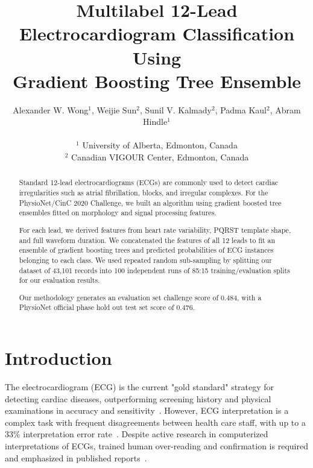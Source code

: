 \documentclass[twocolumn]{cinc}
\begin{document}


\title{Multilabel 12-Lead Electrocardiogram Classification Using \\
Gradient Boosting Tree Ensemble}

\author {Alexander W. Wong$^{1}$, Weijie Sun$^{2}$, Sunil V. Kalmady$^{2}$, Padma Kaul$^{2}$, Abram Hindle$^{1}$\\
\ \\
 $^1$ University of Alberta, Edmonton, Canada \\
$^2$ Canadian VIGOUR Center, Edmonton, Canada }

\maketitle

\begin{abstract}

Standard 12-lead electrocardiograms (ECGs) are commonly used to detect cardiac irregularities such as atrial fibrillation, blocks, and irregular complexes.
For the PhysioNet/CinC 2020 Challenge, we built an algorithm using gradient boosted tree ensembles fitted on morphology and signal processing features.

For each lead, we derived features from heart rate variability, PQRST template shape, and full waveform duration.
We concatenated the features of all 12 leads to fit an ensemble of gradient boosting trees and predicted probabilities of ECG instances belonging to each class.
We used repeated random sub-sampling by splitting our dataset of 43,101 records into 100 independent runs of 85:15 training/evaluation splits for our evaluation results.

Our methodology generates an evaluation set challenge score of 0.484, with a PhysioNet official phase hold out test set score of 0.476.


\end{abstract}

\section{Introduction}

The electrocardiogram (ECG) is the current "gold standard" strategy for detecting cardiac diseases, outperforming screening history and physical examinations in accuracy and sensitivity~\cite{harmon_effectiveness_2015}.
However, ECG interpretation is a complex task with frequent disagreements between health care staff, with up to a 33\% interpretation error rate~\cite{mele_improving_2008}.
Despite active research in computerized interpretations of ECGs, trained human over-reading and confirmation is required and emphasized in published reports~\cite{schlapfer_computer-interpreted_2017}.
\end{document}
